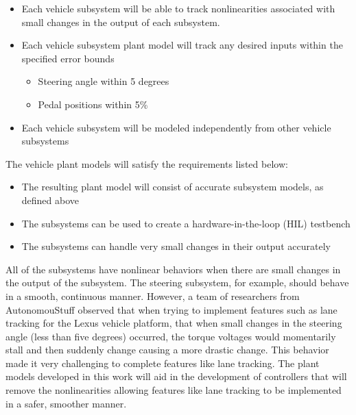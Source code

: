 \documentclass[conference]{IEEEtran}
\begin{document}
\begin{itemize}
  \item Each vehicle subsystem will be able to track nonlinearities %
        associated with small changes in the output of each subsystem. %

\item Each vehicle subsystem plant model will track any desired inputs within the specified error bounds\add{:}
	\begin{itemize}
		\item Steering angle within 5 degrees
		\item Pedal positions within 5\%
	\end{itemize}
\item Each vehicle subsystem will be modeled independently from other vehicle subsystems
\end{itemize}
%
The vehicle plant models will satisfy the requirements listed below:
\begin{itemize}
    \item The resulting plant model will consist of accurate subsystem models, as defined above
    \item The subsystems can be used to create a hardware-in-the-loop (HIL) testbench
    \item The subsystems can handle very small changes in their output accurately
\end{itemize}
%

All of the subsystems have nonlinear behaviors when there are small changes in the output of the subsystem. The steering subsystem, for example, should behave in a smooth, continuous manner. However, a team of researchers from AutonomouStuff observed that when trying to implement features such as lane tracking for the Lexus vehicle platform, that when small changes in the steering angle (less than five degrees) occurred, the torque voltages would momentarily stall and then suddenly change causing a more drastic change. This behavior %
made it very challenging to complete features like lane tracking. The plant models developed in this work will aid in the development of controllers that will remove the nonlinearities allowing features like lane tracking to be implemented in a safer, smoother manner.
\end{document}
